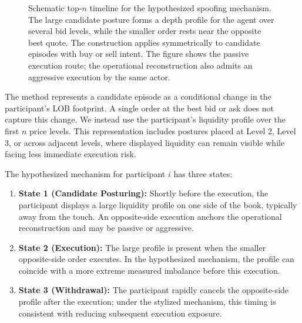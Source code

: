 \documentclass[11pt]{article}
\newenvironment{review}{\begingroup\color{blue}}{\endgroup}
\begin{document}
\begin{figure}[htbp]
{%
    }
    \caption{Schematic top-$n$ timeline for the hypothesized spoofing mechanism. The large candidate posture forms \begin{review}a depth profile for the agent\end{review} over several bid levels, while the smaller order rests near the opposite best quote. The
    construction applies symmetrically to \begin{review}candidate episodes with buy or sell intent\end{review}. The figure shows the passive execution
    route; the operational reconstruction also admits an aggressive execution by the same actor.}
    \label{fig:topn_spoofing_timeline}
\end{figure}

The method represents a candidate episode as a conditional change in the participant's LOB footprint. A single order at
the best bid or ask does not capture this change. We instead use the participant's liquidity profile over the first $n$
price levels. This representation includes postures placed at Level 2, Level 3, or across adjacent levels, where displayed
liquidity can remain visible while facing less immediate execution risk.

\pagebreak[4]

The hypothesized mechanism for participant $i$ has three states:
\begin{enumerate}
    \item \textbf{State 1 (Candidate Posturing):} Shortly before the execution, the participant displays a large
    liquidity profile on one side of the book, typically away from the touch. An opposite-side execution anchors the
    operational reconstruction and may be passive or aggressive.
    \item \textbf{State 2 (Execution):} The large profile is present when the smaller opposite-side order executes. In the
    hypothesized mechanism, the profile can coincide with a more extreme measured imbalance before this execution.
    \item \textbf{State 3 (Withdrawal):} The participant rapidly cancels the opposite-side profile after the execution;
    under the stylized mechanism, this timing is consistent with reducing subsequent execution exposure.
\end{enumerate}
\end{document}
